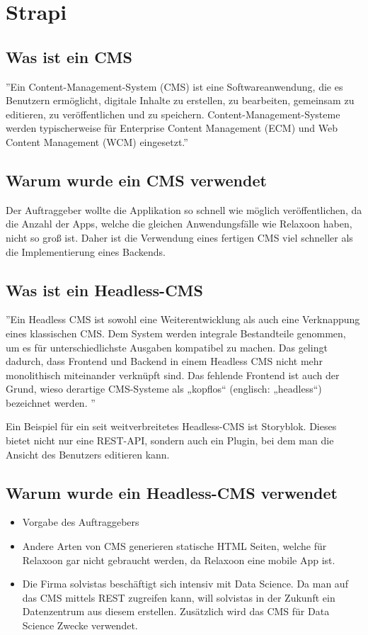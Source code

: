 \section{Strapi}

\subsection{Was ist ein CMS}

''Ein Content-Management-System (CMS) ist eine Softwareanwendung,
die es Benutzern ermöglicht, digitale Inhalte zu erstellen, zu bearbeiten, gemeinsam zu editieren,
zu veröffentlichen und zu speichern. Content-Management-Systeme werden typischerweise für Enterprise
Content Management (ECM) und Web Content Management (WCM) eingesetzt.''
\cite{cms}



\subsection{Warum wurde ein CMS verwendet}
Der Auftraggeber wollte die Applikation so schnell wie möglich veröffentlichen,
da die Anzahl der Apps, welche die gleichen Anwendungsfälle wie Relaxoon haben,
nicht so groß ist.
Daher ist die Verwendung eines fertigen CMS viel schneller als
die Implementierung eines Backends.

\subsection{Was ist ein Headless-CMS}
''Ein Headless CMS ist sowohl eine Weiterentwicklung als
auch eine Verknappung eines klassischen CMS. Dem System
werden integrale Bestandteile genommen, um es für
unterschiedlichste Ausgaben kompatibel zu machen.
Das gelingt dadurch, dass Frontend und Backend in einem
Headless CMS nicht mehr monolithisch miteinander verknüpft
sind. Das fehlende Frontend ist auch der Grund,
wieso derartige CMS-Systeme als
„kopflos“ (englisch: „headless“) bezeichnet werden.
'' \cite{headles-cms}

Ein Beispiel für ein seit weitverbreitetes Headless-CMS ist Storyblok. Dieses bietet nicht nur eine REST-API, sondern 
auch ein Plugin, bei dem man die Ansicht des Benutzers editieren kann. \cite[]{storyblok-bad}

\subsection{Warum wurde ein Headless-CMS verwendet}
\begin{itemize}
    \item Vorgabe des Auftraggebers
    \item Andere Arten von CMS generieren statische HTML Seiten, welche für Relaxoon gar nicht gebraucht werden,
          da Relaxoon eine mobile App ist.
    \item Die Firma solvistas beschäftigt sich intensiv mit Data Science. Da man auf das CMS mittels REST zugreifen kann,
          will solvistas in der Zukunft ein Datenzentrum aus diesem erstellen.
          Zusätzlich wird das CMS für Data Science Zwecke verwendet.
\end{itemize}

